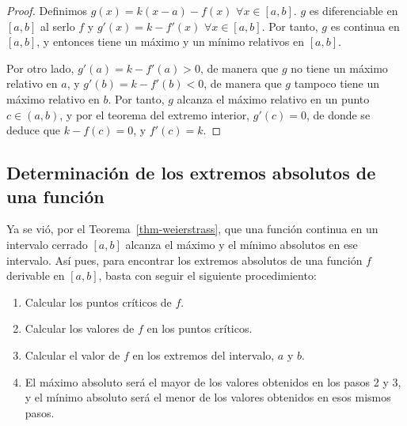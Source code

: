 \documentclass[
  a4paper,
]{scrreport}
\providecommand{\tightlist}{%
  \setlength{\itemsep}{0pt}\setlength{\parskip}{0pt}}\usepackage{longtable,booktabs,array}
\theoremstyle{definition}
\theoremstyle{definition}
\theoremstyle{definition}
\theoremstyle{plain}
\theoremstyle{plain}
\theoremstyle{plain}
\theoremstyle{remark}
\begin{document}
\begin{tcolorbox}[enhanced jigsaw, bottomtitle=1mm, title=\textcolor{quarto-callout-note-color}{\faInfo}\hspace{0.5em}{Demostración}, colbacktitle=quarto-callout-note-color!10!white, coltitle=black, leftrule=.75mm, colback=white, toptitle=1mm, toprule=.15mm, titlerule=0mm, opacitybacktitle=0.6, colframe=quarto-callout-note-color-frame, bottomrule=.15mm, arc=.35mm, rightrule=.15mm, breakable, left=2mm, opacityback=0]

\begin{proof}
Definimos \(g(x)=k(x-a)-f(x)\) \(\forall x\in[a,b]\). \(g\) es
diferenciable en \([a,b]\) al serlo \(f\) y \(g'(x)=k-f'(x)\)
\(\forall x\in[a,b]\). Por tanto, \(g\) es continua en \([a,b]\), y
entonces tiene un máximo y un mínimo relativos en \([a,b]\).

Por otro lado, \(g'(a)=k-f'(a)>0\), de manera que \(g\) no tiene un
máximo relativo en \(a\), y \(g'(b)=k-f'(b)<0\), de manera que \(g\)
tampoco tiene un máximo relativo en \(b\). Por tanto, \(g\) alcanza el
máximo relativo en un punto \(c\in (a,b)\), y por el teorema del extremo
interior, \(g'(c)=0\), de donde se deduce que \(k-f(c)=0\), y
\(f'(c)=k\).
\end{proof}

\end{tcolorbox}

\subsection{Determinación de los extremos absolutos de una
función}\label{determinaciuxf3n-de-los-extremos-absolutos-de-una-funciuxf3n}

Ya se vió, por el Teorema~\ref{thm-weierstrass}, que una función
continua en un intervalo cerrado \([a,b]\) alcanza el máximo y el mínimo
absolutos en ese intervalo. Así pues, para encontrar los extremos
absolutos de una función \(f\) derivable en \([a,b]\), basta con seguir
el siguiente procedimiento:

\begin{enumerate}
\def\labelenumi{\arabic{enumi}.}
\tightlist
\item
  Calcular los puntos críticos de \(f\).
\item
  Calcular los valores de \(f\) en los puntos críticos.
\item
  Calcular el valor de \(f\) en los extremos del intervalo, \(a\) y
  \(b\).
\item
  El máximo absoluto será el mayor de los valores obtenidos en los pasos
  2 y 3, y el mínimo absoluto será el menor de los valores obtenidos en
  esos mismos pasos.
\end{enumerate}
\end{document}
